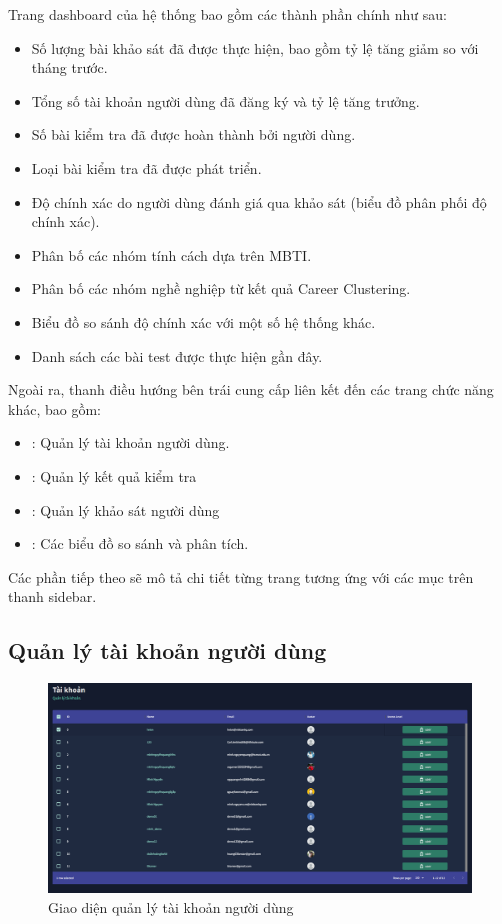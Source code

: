 Trang dashboard của hệ thống bao gồm các thành phần chính như sau:
\begin{itemize}
    \item Số lượng bài khảo sát đã được thực hiện, bao gồm tỷ lệ tăng giảm so với tháng trước.
    \item Tổng số tài khoản người dùng đã đăng ký và tỷ lệ tăng trưởng.
    \item Số bài kiểm tra đã được hoàn thành bởi người dùng.
    \item Loại bài kiểm tra đã được phát triển.
    \item Độ chính xác do người dùng đánh giá qua khảo sát (biểu đồ phân phối độ chính xác).
    \item Phân bố các nhóm tính cách dựa trên MBTI.
    \item Phân bố các nhóm nghề nghiệp từ kết quả Career Clustering.
    \item Biểu đồ so sánh độ chính xác với một số hệ thống khác.
    \item Danh sách các bài test được thực hiện gần đây.
\end{itemize}

Ngoài ra, thanh điều hướng bên trái cung cấp liên kết đến các trang chức năng khác, bao gồm:
\begin{itemize}
    \item {}: Quản lý tài khoản người dùng.
    \item {}: Quản lý kết quả kiểm tra
    \item {}: Quản lý khảo sát người dùng
    \item {}: Các biểu đồ so sánh và phân tích.
\end{itemize}

Các phần tiếp theo sẽ mô tả chi tiết từng trang tương ứng với các mục trên thanh sidebar.

\subsection{Quản lý tài khoản người dùng}
\label{sec:account_management}
\begin{figure}[H]
    \centering
    \includegraphics[width=0.75\linewidth]{images/accAdmin.png}
    \vspace{0.6cm}
    \caption{Giao diện quản lý tài khoản người dùng}
\end{figure}

